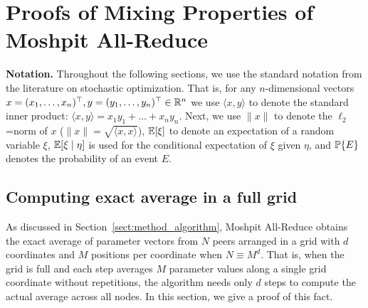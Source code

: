 \section{Proofs of Mixing Properties of Moshpit All-Reduce}\label{sect:missing_proofs}

\textbf{Notation.} Throughout the following sections, we use the standard notation from the literature on stochastic optimization. That is, for any $n$-dimensional vectors $x = (x_1,\ldots,x_n)^\top,y = (y_1,\ldots,y_n)^\top\in\mathbb{R}^n$ we use $\langle x,y\rangle$ to denote the standard inner product: $\langle x, y\rangle = x_1y_1 + \ldots + x_ny_n$. Next, we use $\|x\|$ to denote the $\ell_2$=norm of $x$ ($\|x\| = \sqrt{\langle x, x\rangle}$), $\mathbb{E}[\xi]$ to denote an expectation of a random variable $\xi$, $\mathbb{E}[\xi\mid \eta]$ is used for the conditional expectation of $\xi$ given $\eta$, and $\mathbb{P}\{E\}$ denotes the probability of an event $E$.

\subsection{Computing exact average in a full grid}\label{sect:equiv_to_torus}
As discussed in Section~\ref{sect:method_algorithm}, Moshpit All-Reduce obtains the exact average of parameter vectors from $N$ peers arranged in a grid with $d$ coordinates and $M$ positions per coordinate when $N\equiv M^d$. That is, when the grid is full and each step averages $M$ parameter values along a single grid coordinate without repetitions, the algorithm needs only $d$ steps to compute the actual average across all nodes. In this section, we give a proof of this fact.

